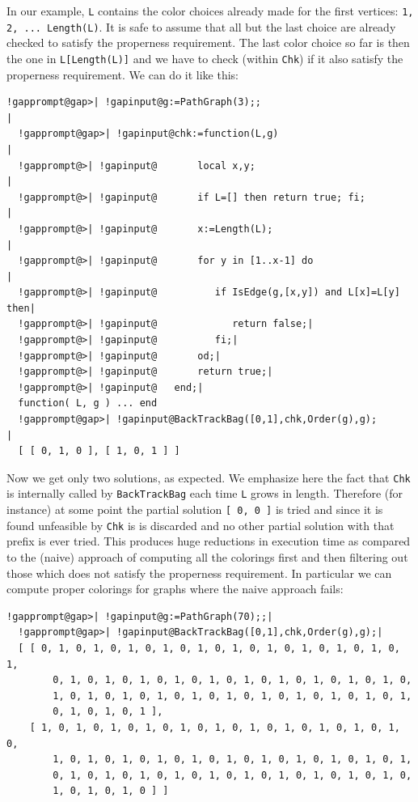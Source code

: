 \documentclass[a4paper,11pt]{report}
\begin{document}
{{In our example, \texttt{L} contains the color choices already made for the first vertices: \texttt{1, 2, ... Length(L)}. It is safe to assume that all but the last choice are already checked to
satisfy the properness requirement. The last color choice so far is then the
one in \texttt{L[Length(L)]} and we have to check (within \texttt{Chk}) if it also satisfy the properness requirement. We can do it like this: 

 
\begin{Verbatim}[commandchars=!@|,fontsize=\small,frame=single,label=Example]
  !gapprompt@gap>| !gapinput@g:=PathGraph(3);;                                    |
  !gapprompt@gap>| !gapinput@chk:=function(L,g)                                   |
  !gapprompt@>| !gapinput@       local x,y;                                           |
  !gapprompt@>| !gapinput@       if L=[] then return true; fi;                        |
  !gapprompt@>| !gapinput@       x:=Length(L);                                        |
  !gapprompt@>| !gapinput@       for y in [1..x-1] do                                 |
  !gapprompt@>| !gapinput@          if IsEdge(g,[x,y]) and L[x]=L[y] then|
  !gapprompt@>| !gapinput@             return false;|
  !gapprompt@>| !gapinput@          fi;|
  !gapprompt@>| !gapinput@       od;|
  !gapprompt@>| !gapinput@       return true;|
  !gapprompt@>| !gapinput@   end;|
  function( L, g ) ... end
  !gapprompt@gap>| !gapinput@BackTrackBag([0,1],chk,Order(g),g);                     |
  [ [ 0, 1, 0 ], [ 1, 0, 1 ] ]
\end{Verbatim}
 

Now we get only two solutions, as expected. We emphasize here the fact that \texttt{Chk} is internally called by \texttt{BackTrackBag} each time \texttt{L} grows in length. Therefore (for instance) at some point the partial solution \texttt{[ 0, 0 ]} is tried and since it is found unfeasible by \texttt{Chk} is is discarded and no other partial solution with that prefix is ever tried.
This produces huge reductions in execution time as compared to the (naive)
approach of computing all the colorings first and then filtering out those
which does not satisfy the properness requirement. In particular we can
compute proper colorings for graphs where the naive approach fails: 

 
\begin{Verbatim}[commandchars=!@|,fontsize=\small,frame=single,label=Example]
  !gapprompt@gap>| !gapinput@g:=PathGraph(70);;|
  !gapprompt@gap>| !gapinput@BackTrackBag([0,1],chk,Order(g),g);|
  [ [ 0, 1, 0, 1, 0, 1, 0, 1, 0, 1, 0, 1, 0, 1, 0, 1, 0, 1, 0, 1, 0, 1, 
        0, 1, 0, 1, 0, 1, 0, 1, 0, 1, 0, 1, 0, 1, 0, 1, 0, 1, 0, 1, 0, 
        1, 0, 1, 0, 1, 0, 1, 0, 1, 0, 1, 0, 1, 0, 1, 0, 1, 0, 1, 0, 1, 
        0, 1, 0, 1, 0, 1 ], 
    [ 1, 0, 1, 0, 1, 0, 1, 0, 1, 0, 1, 0, 1, 0, 1, 0, 1, 0, 1, 0, 1, 0, 
        1, 0, 1, 0, 1, 0, 1, 0, 1, 0, 1, 0, 1, 0, 1, 0, 1, 0, 1, 0, 1, 
        0, 1, 0, 1, 0, 1, 0, 1, 0, 1, 0, 1, 0, 1, 0, 1, 0, 1, 0, 1, 0, 
        1, 0, 1, 0, 1, 0 ] ]
\end{Verbatim}
 

}}
\end{document}
